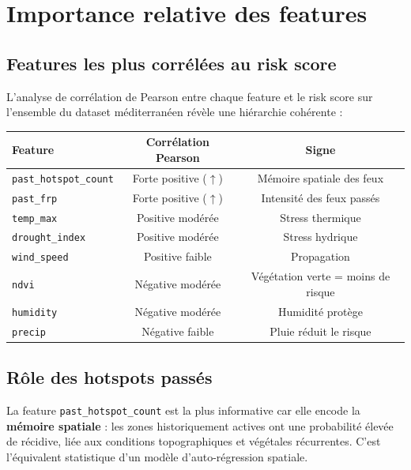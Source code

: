 \documentclass[12pt,a4paper]{report}
\begin{document}
\section{Importance relative des features}

\subsection{Features les plus corrélées au risk score}

L'analyse de corrélation de Pearson entre chaque feature et le risk score sur
l'ensemble du dataset méditerranéen révèle une hiérarchie cohérente :

\begin{center}
\begin{tabular}{lcc}
\toprule
\rowcolor{fireOrange!15}
\textbf{Feature} & \textbf{Corrélation Pearson} & \textbf{Signe} \\
\midrule
\texttt{past\_hotspot\_count} & Forte positive ($\uparrow$) & Mémoire spatiale des feux \\
\texttt{past\_frp}            & Forte positive ($\uparrow$) & Intensité des feux passés \\
\texttt{temp\_max}            & Positive modérée            & Stress thermique \\
\texttt{drought\_index}       & Positive modérée            & Stress hydrique \\
\texttt{wind\_speed}          & Positive faible             & Propagation \\
\texttt{ndvi}                 & Négative modérée            & Végétation verte = moins de risque \\
\texttt{humidity}             & Négative modérée            & Humidité protège \\
\texttt{precip}               & Négative faible             & Pluie réduit le risque \\
\bottomrule
\end{tabular}
\end{center}

\subsection{Rôle des hotspots passés}

La feature \texttt{past\_hotspot\_count} est la plus informative car elle encode
la \textbf{mémoire spatiale} : les zones historiquement actives ont une probabilité
élevée de récidive, liée aux conditions topographiques et végétales récurrentes.
C'est l'équivalent statistique d'un modèle d'auto-régression spatiale.
\end{document}
